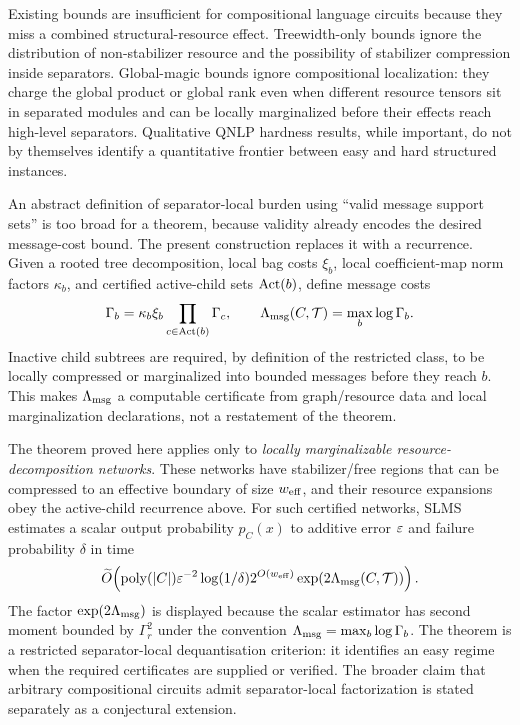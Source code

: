 Existing bounds are insufficient for compositional language circuits because they miss a combined structural-resource effect. Treewidth-only bounds ignore the distribution of non-stabilizer resource and the possibility of stabilizer compression inside separators. Global-magic bounds ignore compositional localization: they charge the global product or global rank even when different resource tensors sit in separated modules and can be locally marginalized before their effects reach high-level separators. Qualitative QNLP hardness results, while important, do not by themselves identify a quantitative frontier between easy and hard structured instances.

An abstract definition of separator-local burden using ``valid message support sets'' is too broad for a theorem, because validity already encodes the desired message-cost bound. The present construction replaces it with a recurrence. Given a rooted tree decomposition, local bag costs \(\xi_b\), local coefficient-map norm factors \(\kappa_b\), and certified active-child sets \(\operatorname{Act}(b)\), define message costs
\[
\Gamma_b=\kappa_b\xi_b\prod_{c\in\operatorname{Act}(b)}\Gamma_c,
\qquad
\Lambda_{\mathrm{msg}}(C,\mathcal{T})=\max_b\log\Gamma_b.
\]
Inactive child subtrees are required, by definition of the restricted class, to be locally compressed or marginalized into bounded messages before they reach \(b\). This makes \(\Lambda_{\mathrm{msg}}\) a computable certificate from graph/resource data and local marginalization declarations, not a restatement of the theorem.

The theorem proved here applies only to \emph{locally marginalizable resource-decomposition networks}. These networks have stabilizer/free regions that can be compressed to an effective boundary of size \(w_{\mathrm{eff}}\), and their resource expansions obey the active-child recurrence above. For such certified networks, SLMS estimates a scalar output probability \(p_C(x)\) to additive error \(\varepsilon\) and failure probability \(\delta\) in time
\[
\widetilde{O}\!\left(
\operatorname{poly}(|C|)\varepsilon^{-2}\log(1/\delta)
2^{O(w_{\mathrm{eff}})}
\exp(2\Lambda_{\mathrm{msg}}(C,\mathcal{T}))
\right).
\]
The factor \(\exp(2\Lambda_{\mathrm{msg}})\) is displayed because the scalar estimator has second moment bounded by \(\Gamma_r^2\) under the convention \(\Lambda_{\mathrm{msg}}=\max_b\log\Gamma_b\). The theorem is a restricted separator-local dequantisation criterion: it identifies an easy regime when the required certificates are supplied or verified. The broader claim that arbitrary compositional circuits admit separator-local factorization is stated separately as a conjectural extension.

